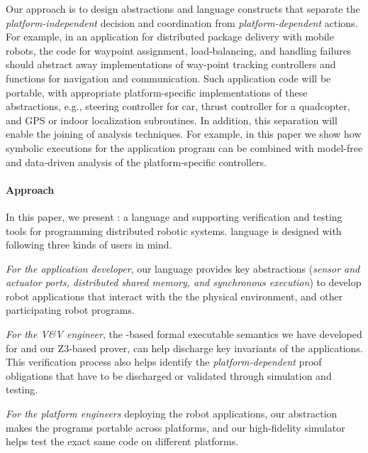Our approach is to design abstractions and language constructs that separate the \emph{platform-independent} decision and coordination from \emph{platform-dependent} actions.
For example, in an application for distributed package delivery with mobile robots,
the code for waypoint assignment, load-balancing, and handling failures should abstract away implementations of way-point tracking controllers and functions for navigation and communication.
Such application code will be portable, with appropriate platform-specific implementations of these abstractions,
e.g., steering controller for car, thrust controller for a quadcopter, and GPS or indoor localization subroutines.
%
In addition, this separation will enable the joining of analysis techniques.
For example, in this paper we show how symbolic executions for the application program can be combined with model-free and data-driven analysis of the platform-specific controllers.

\paragraph{Approach}
In this paper, we present \lgname: a language and supporting verification and testing tools for programming distributed robotic systems.
\lgname language is designed with following three kinds of users in mind.
\begin{noinditem}
\item \emph{For the application developer}, our \lgname language provides key abstractions (\emph{sensor and actuator ports, distributed shared memory, and synchronous execution})
      to develop robot applications that interact with the the physical environment, and other participating robot programs.
\item \emph{For the V\&V engineer}, the \K-based formal executable semantics we have developed for \lgname and our Z3-based prover,
      can help discharge key invariants of the \lgname applications.
      This verification process also helps identify the \emph{platform-dependent} proof obligations that have to be discharged or validated through simulation and testing.
\item \emph{For the platform engineers} deploying the robot applications, our abstraction makes the \lgname programs portable across platforms,
      and our high-fidelity \lgname simulator helps test the exact same code on different platforms.
\end{noinditem}

